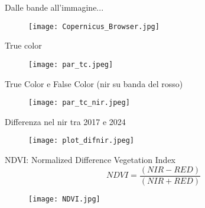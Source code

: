 \documentclass{beamer} %
\begin{document}
\begin{frame}{Dalle bande all'immagine...}
 \begin{multicols}{2}
    
    \columnbreak
    \begin{figure}
        \raggedleft %
        \texttt{[image: Copernicus\_Browser.jpg]}
    \end{figure}
    \end{multicols}
\end{frame}

\begin{frame}{True color}

\begin{figure}
    \centering
    \texttt{[image: par\_tc.jpeg]}
        \end{figure}
        \end{frame}

\begin{frame}{True Color e False Color (nir su banda del rosso)}
\begin{figure}
    \centering
    \texttt{[image: par\_tc\_nir.jpeg]}
\end{figure}
        \end{frame}

\begin{frame}{Differenza nel nir tra 2017 e 2024}

    \begin{figure}
        \centering
        \texttt{[image: plot\_difnir.jpeg]}
    \end{figure}
\end{frame}

 \begin{frame}{NDVI: Normalized Difference Vegetation Index}
            \begin{equation}
                NDVI = \frac{(NIR - RED)}{(NIR + RED)}
            \end{equation}
            \begin{figure}
                \centering
                \texttt{[image: NDVI.jpg]}
            \end{figure}
        \end{frame}
\end{document}
